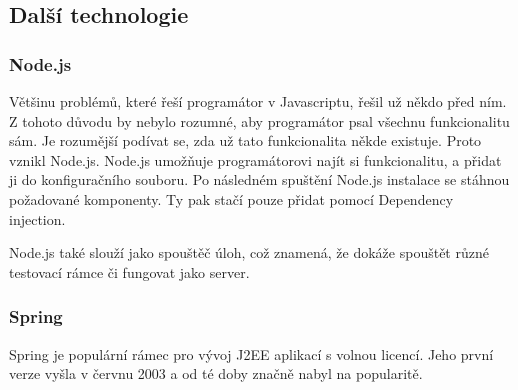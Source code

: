 \documentclass[czech,master,public,dept460,male,cpdeclaration,twoside]{diploma}
\begin{document}
\subsection{Další technologie}

\subsubsection{Node.js}
Většinu problémů, které řeší programátor v Javascriptu, řešil už někdo před ním. Z tohoto důvodu by nebylo rozumné, aby programátor psal všechnu funkcionalitu sám. Je rozumější podívat se, zda už tato funkcionalita někde existuje. Proto vznikl Node.js. Node.js umožňuje programátorovi najít si funkcionalitu, a přidat ji do konfiguračního souboru. Po následném spuštění Node.js instalace se stáhnou požadované komponenty. Ty pak stačí pouze přidat pomocí Dependency injection.

Node.js také slouží jako spouštěč úloh, což znamená, že dokáže spouštět různé testovací rámce či fungovat jako server. \cite{nodeJS}

\subsubsection{Spring}
Spring je populární rámec pro vývoj J2EE aplikací s volnou licencí. Jeho první verze vyšla v červnu 2003 a od té doby značně nabyl na popularitě. 
\end{document}
